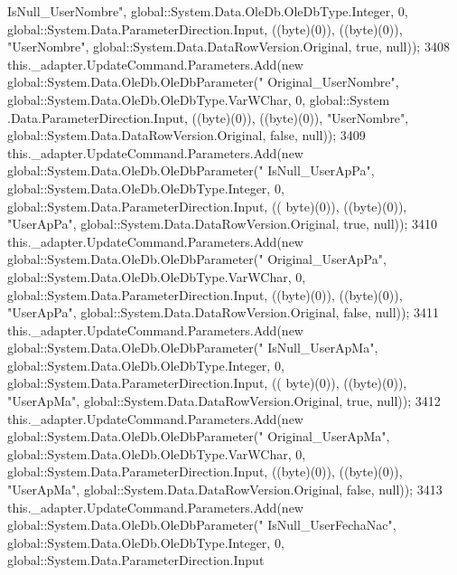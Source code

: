 \begin{DoxyCode}
{      IsNull\_UserNombre"}, global::System.Data.OleDb.OleDbType.Integer, 0, global::System.Data.ParameterDirection.Input, 
      ((byte)(0)), ((byte)(0)), \textcolor{stringliteral}{"UserNombre"}, global::System.Data.DataRowVersion.Original, \textcolor{keyword}{true}, null));
3408             this.\_adapter.UpdateCommand.Parameters.Add(\textcolor{keyword}{new} global::System.Data.OleDb.OleDbParameter(\textcolor{stringliteral}{"
      Original\_UserNombre"}, global::System.Data.OleDb.OleDbType.VarWChar, 0, global::System
      .Data.ParameterDirection.Input, ((byte)(0)), ((byte)(0)), \textcolor{stringliteral}{"UserNombre"}, global::System.Data.DataRowVersion.Original, \textcolor{keyword}{false}, null));
3409             this.\_adapter.UpdateCommand.Parameters.Add(\textcolor{keyword}{new} global::System.Data.OleDb.OleDbParameter(\textcolor{stringliteral}{"
      IsNull\_UserApPa"}, global::System.Data.OleDb.OleDbType.Integer, 0, global::System.Data.ParameterDirection.Input, ((
      byte)(0)), ((byte)(0)), \textcolor{stringliteral}{"UserApPa"}, global::System.Data.DataRowVersion.Original, \textcolor{keyword}{true}, null));
3410             this.\_adapter.UpdateCommand.Parameters.Add(\textcolor{keyword}{new} global::System.Data.OleDb.OleDbParameter(\textcolor{stringliteral}{"
      Original\_UserApPa"}, global::System.Data.OleDb.OleDbType.VarWChar, 0, global::System.Data.ParameterDirection.Input,
       ((byte)(0)), ((byte)(0)), \textcolor{stringliteral}{"UserApPa"}, global::System.Data.DataRowVersion.Original, \textcolor{keyword}{false}, null));
3411             this.\_adapter.UpdateCommand.Parameters.Add(\textcolor{keyword}{new} global::System.Data.OleDb.OleDbParameter(\textcolor{stringliteral}{"
      IsNull\_UserApMa"}, global::System.Data.OleDb.OleDbType.Integer, 0, global::System.Data.ParameterDirection.Input, ((
      byte)(0)), ((byte)(0)), \textcolor{stringliteral}{"UserApMa"}, global::System.Data.DataRowVersion.Original, \textcolor{keyword}{true}, null));
3412             this.\_adapter.UpdateCommand.Parameters.Add(\textcolor{keyword}{new} global::System.Data.OleDb.OleDbParameter(\textcolor{stringliteral}{"
      Original\_UserApMa"}, global::System.Data.OleDb.OleDbType.VarWChar, 0, global::System.Data.ParameterDirection.Input,
       ((byte)(0)), ((byte)(0)), \textcolor{stringliteral}{"UserApMa"}, global::System.Data.DataRowVersion.Original, \textcolor{keyword}{false}, null));
3413             this.\_adapter.UpdateCommand.Parameters.Add(\textcolor{keyword}{new} global::System.Data.OleDb.OleDbParameter(\textcolor{stringliteral}{"
      IsNull\_UserFechaNac"}, global::System.Data.OleDb.OleDbType.Integer, 0, global::System.Data.ParameterDirection.Input

\end{DoxyCode}
